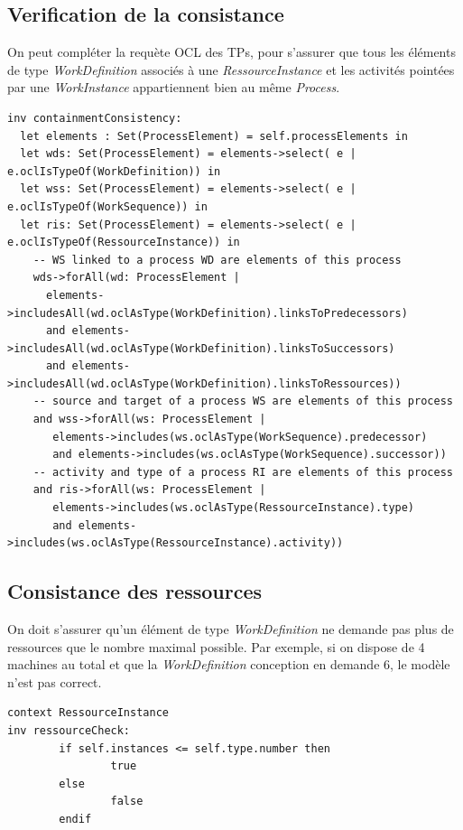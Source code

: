 \documentclass{report}
\begin{document}
\subsection{Verification de la consistance}

On peut compléter la requète OCL des TPs, pour s'assurer que tous les éléments de type \textit{WorkDefinition} associés à une \textit{RessourceInstance} et les activités pointées par une \textit{WorkInstance} appartiennent bien au même \textit{Process}.

\begin{verbatim}
inv containmentConsistency:
  let elements : Set(ProcessElement) = self.processElements in
  let wds: Set(ProcessElement) = elements->select( e | e.oclIsTypeOf(WorkDefinition)) in
  let wss: Set(ProcessElement) = elements->select( e | e.oclIsTypeOf(WorkSequence)) in
  let ris: Set(ProcessElement) = elements->select( e | e.oclIsTypeOf(RessourceInstance)) in
    -- WS linked to a process WD are elements of this process
    wds->forAll(wd: ProcessElement |
      elements->includesAll(wd.oclAsType(WorkDefinition).linksToPredecessors)
      and elements->includesAll(wd.oclAsType(WorkDefinition).linksToSuccessors)
      and elements->includesAll(wd.oclAsType(WorkDefinition).linksToRessources))
    -- source and target of a process WS are elements of this process
    and wss->forAll(ws: ProcessElement |
       elements->includes(ws.oclAsType(WorkSequence).predecessor)
       and elements->includes(ws.oclAsType(WorkSequence).successor))
    -- activity and type of a process RI are elements of this process
    and ris->forAll(ws: ProcessElement |
       elements->includes(ws.oclAsType(RessourceInstance).type)
       and elements->includes(ws.oclAsType(RessourceInstance).activity))
\end{verbatim}

\subsection{Consistance des ressources}

On doit s'assurer qu'un élément de type \textit{WorkDefinition} ne demande pas plus de ressources que le nombre maximal possible.
Par exemple, si on dispose de 4 machines au total et que la \textit{WorkDefinition} conception en demande 6, le modèle n'est pas correct.

\begin{verbatim}
context RessourceInstance
inv ressourceCheck:
        if self.instances <= self.type.number then
                true
        else
                false
        endif
\end{verbatim}
\end{document}
